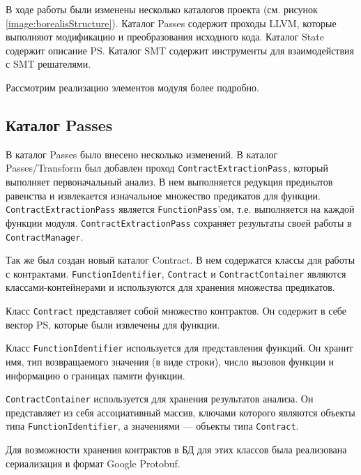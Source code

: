 В ходе работы были изменены несколько каталогов проекта (см. рисунок \ref{image:borealisStructure}). Каталог Passes содержит проходы LLVM, которые выполняют модификацию и преобразования исходного кода. Каталог State содержит описание PS. Каталог SMT содержит инструменты для взаимодействия с SMT решателями.

Рассмотрим реализацию элементов модуля более подробно.

\subsection{Каталог Passes}
В каталог Passes было внесено несколько изменений. В каталог Passes/Transform был добавлен проход \texttt{ContractExtractionPass}, который выполняет первоначальный анализ. В нем выполняется редукция предикатов равенства и извлекается изначальное множество предикатов для функции. \texttt{ContractExtractionPass} является \texttt{FunctionPass}'ом, т.е. выполняется на каждой функции модуля. \texttt{ContractExtractionPass} сохраняет результаты своей работы в \texttt{ContractManager}.

Так же был создан новый каталог Contract. В нем содержатся классы для работы с контрактами. \texttt{FunctionIdentifier}, \texttt{Contract} и \texttt{ContractContainer} являются классами-контейнерами и используются для хранения множества предикатов. 

Класс \texttt{Contract} представляет собой множество контрактов. Он содержит в себе вектор PS, которые были извлечены для функции.

Класс \texttt{FunctionIdentifier} используется для представления функций. Он хранит имя,  тип возвращаемого значения (в виде строки), число вызовов функции и информацию о границах памяти функции.

\texttt{ContractContainer} используется для хранения результатов анализа. Он представляет из себя ассоциативный массив, ключами которого являются объекты типа \texttt{FunctionIdentifier}, а значениями --- объекты типа \texttt{Contract}.

Для возможности хранения контрактов в БД для этих классов была реализована сериализация в формат Google Protobuf\cite{protobuf}. 

